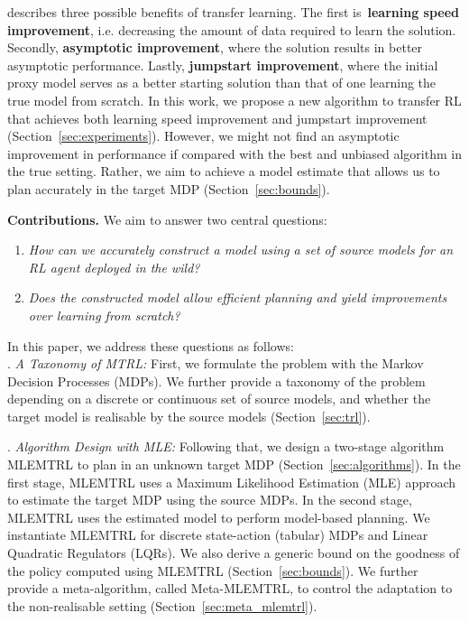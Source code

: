 \citep{langley2006transfer} describes three possible benefits of transfer learning. The first is~\textbf{learning speed improvement}, i.e. decreasing the amount of data required to learn the solution. Secondly, \textbf{asymptotic improvement}, where the solution results in better asymptotic performance. Lastly, \textbf{jumpstart improvement}, where the initial proxy model serves as a better starting solution than that of one learning the true model from scratch. In this work, we propose a new algorithm to transfer RL that achieves both learning speed improvement and jumpstart improvement (Section~\ref{sec:experiments}). However, we might not find an asymptotic improvement in performance if compared with the best and unbiased algorithm in the true setting. Rather, we aim to achieve a model estimate that allows us to plan accurately in the target MDP (Section~\ref{sec:bounds}).%

\noindent\textbf{Contributions.} We aim to answer two central questions:
\begin{enumerate}
    \item  \emph{How can we accurately construct a model using a set of source models for an RL agent deployed in the wild?} 
    \item \emph{Does the constructed model allow efficient planning and yield improvements over learning from scratch?}
\end{enumerate}
In this paper, we address these questions as follows:\\
. \textit{A Taxonomy of MTRL:} First, we formulate the problem with the Markov Decision Processes (MDPs). %
We further provide a taxonomy of the problem depending on a discrete or continuous set of source models, and whether the target model is realisable by the source models (Section~\ref{sec:trl}).%

. \textit{Algorithm Design with MLE:} Following that, we design a two-stage algorithm MLEMTRL to plan in an unknown target MDP (Section~\ref{sec:algorithms}). In the first stage, MLEMTRL uses a Maximum Likelihood Estimation (MLE) approach to estimate the target MDP using the source MDPs. In the second stage, MLEMTRL uses the estimated model to perform model-based planning. We instantiate MLEMTRL for discrete state-action (tabular) MDPs and Linear Quadratic Regulators (LQRs). We also derive a generic bound on the goodness of the policy computed using MLEMTRL (Section~\ref{sec:bounds}). We further provide a meta-algorithm, called Meta-MLEMTRL, to control the adaptation to the non-realisable setting (Section~\ref{sec:meta_mlemtrl}).%

